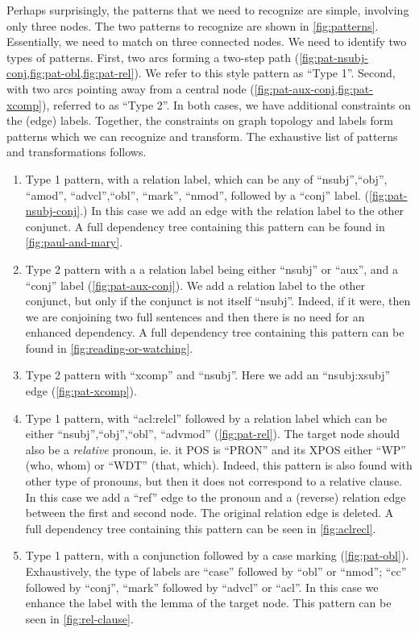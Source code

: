 \documentclass[11pt,a4paper]{article}
\begin{document}
Perhaps surprisingly, the patterns that we need to recognize are
simple, involving only three nodes. The two patterns to recognize
are shown in \cref{fig:patterns}. Essentially, we need to match
on three connected nodes.  We need to identify two types of
patterns. First, two arcs forming a two-step path
(\cref{fig:pat-nsubj-conj,fig:pat-obl,fig:pat-rel}). We refer to
this style pattern as ``Type 1''.  Second, with two arcs pointing
away from a central node (\cref{fig:pat-aux-conj,fig:pat-xcomp}),
referred to as ``Type 2''.  In both cases, we have additional
constraints on the (edge) labels. Together, the constraints on
graph topology and labels form patterns which we can recognize
and transform.  The exhaustive list of patterns and
transformations follows.

\begin{enumerate}
\item Type 1 pattern, with a relation label, which can be any of
  ``nsubj'',``obj'', ``amod'', ``advcl'',``obl'', ``mark'', ``nmod'', followed by a
  ``conj'' label. (\cref{fig:pat-nsubj-conj}.) In this case we add an
  edge with the relation label to the other conjunct.
  A full dependency tree containing this pattern can be found in \cref{fig:paul-and-mary}.
  \label{item:paul-and-mary}
\item Type 2 pattern with a a relation label being either ``nsubj'' or
  ``aux'', and a ``conj'' label (\cref{fig:pat-aux-conj}). We add a
  relation label to the other conjunct, but only if the
  conjunct is not itself ``nsubj''. Indeed, if it were, then we are
  conjoining two full sentences and then there is no need for an
  enhanced dependency.
  A full dependency tree containing this pattern can be found in \cref{fig:reading-or-watching}.
  \label{item:reading-or-watching}
\item Type 2 pattern with ``xcomp'' and ``nsubj''. Here we add an
  ``nsubj:xsubj'' edge (\cref{fig:pat-xcomp}).
\item Type 1 pattern, with ``acl:relcl'' followed by a relation label
  which can be either ``nsubj'',``obj'',``obl'',
  ``advmod'' (\cref{fig:pat-rel}). The target node should also be a
  \emph{relative} pronoun, ie. it POS is ``PRON'' and its XPOS either
  ``WP'' (who, whom) or ``WDT'' (that, which). Indeed, this pattern is
  also found with other type of pronouns, but then it does not
  correspond to a relative clause.  In this case we add a ``ref'' edge to
  the pronoun and a (reverse) relation edge between the first and
  second node. The original relation edge is deleted. A full dependency
  tree containing this pattern can be seen in \cref{fig:aclrecl}.
  \item Type 1 pattern, with a conjunction followed by a case
   marking (\cref{fig:pat-obl}). Exhaustively, the type of labels
   are ``case'' followed by ``obl'' or ``nmod''; ``cc'' followed by
   ``conj'', ``mark'' followed by ``advcl'' or ``acl''. In this case we
   enhance the label with the lemma of the target node. This pattern
   can be seen in \cref{fig:rel-clause}.
\end{enumerate}
\end{document}
